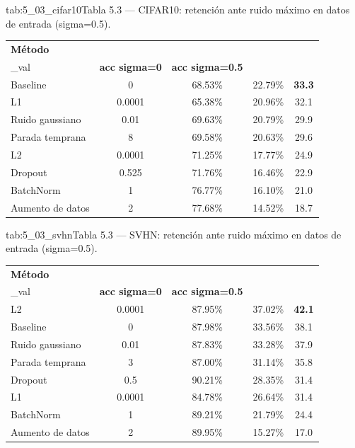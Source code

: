 \begin{table}{tab:5_03_cifar10}{Tabla 5.3 — CIFAR10: retención ante ruido máximo en datos de entrada (sigma=0.5).}
\small
\begin{tabular}{lcccc}
\toprule
\textbf{Método} & \textbf{reg\\_val} & \textbf{acc sigma=0} & \textbf{acc sigma=0.5} & \textbf{Retención (\\%
\midrule
Baseline & 0 & 68.53\% & 22.79\% & \textbf{33.3} \\
L1 & 0.0001 & 65.38\% & 20.96\% & 32.1 \\
Ruido gaussiano & 0.01 & 69.63\% & 20.79\% & 29.9 \\
Parada temprana & 8 & 69.58\% & 20.63\% & 29.6 \\
L2 & 0.0001 & 71.25\% & 17.77\% & 24.9 \\
Dropout & 0.525 & 71.76\% & 16.46\% & 22.9 \\
BatchNorm & 1 & 76.77\% & 16.10\% & 21.0 \\
Aumento de datos & 2 & 77.68\% & 14.52\% & 18.7 \\
\bottomrule
\end{tabular}
\end{table}

\begin{table}{tab:5_03_svhn}{Tabla 5.3 — SVHN: retención ante ruido máximo en datos de entrada (sigma=0.5).}
\small
\begin{tabular}{lcccc}
\toprule
\textbf{Método} & \textbf{reg\\_val} & \textbf{acc sigma=0} & \textbf{acc sigma=0.5} & \textbf{Retención (\\%
\midrule
L2 & 0.0001 & 87.95\% & 37.02\% & \textbf{42.1} \\
Baseline & 0 & 87.98\% & 33.56\% & 38.1 \\
Ruido gaussiano & 0.01 & 87.83\% & 33.28\% & 37.9 \\
Parada temprana & 3 & 87.00\% & 31.14\% & 35.8 \\
Dropout & 0.5 & 90.21\% & 28.35\% & 31.4 \\
L1 & 0.0001 & 84.78\% & 26.64\% & 31.4 \\
BatchNorm & 1 & 89.21\% & 21.79\% & 24.4 \\
Aumento de datos & 2 & 89.95\% & 15.27\% & 17.0 \\
\bottomrule
\end{tabular}
\end{table}

